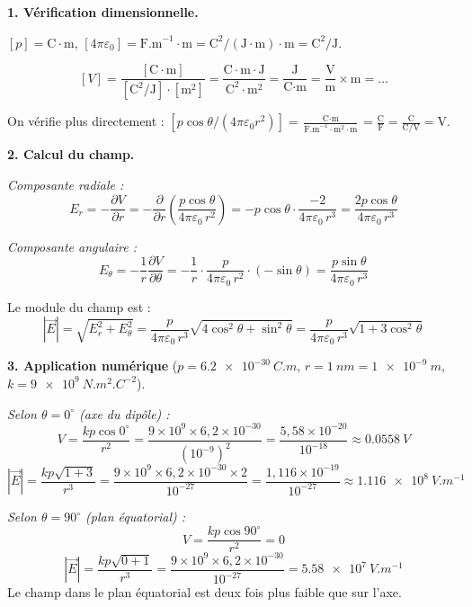 \documentclass[12pt,a4paper]{article}
\begin{document}
\begin{boitecorrige}
\textbf{1. Vérification dimensionnelle.}

$[p] = \text{C}\cdot\text{m}$, $[4\pi\varepsilon_0] = \text{F.m}^{-1}\cdot\text{m} = \text{C}^2/(\text{J}\cdot\text{m}) \cdot\text{m} = \text{C}^2/\text{J}$.

\[
[V] = \frac{[\text{C}\cdot\text{m}]}{[\text{C}^2/\text{J}]\cdot[\text{m}^2]} = \frac{\text{C}\cdot\text{m}\cdot\text{J}}{\text{C}^2\cdot\text{m}^2} = \frac{\text{J}}{\text{C}\cdot\text{m}} = \frac{\text{V}}{\text{m}} \times\text{m} = \ldots
\]

On vérifie plus directement : $[p\cos\theta/(4\pi\varepsilon_0 r^2)] = \frac{\text{C}\cdot\text{m}}{\text{F.m}^{-1}\cdot\text{m}^2\cdot\text{m}} = \frac{\text{C}}{\text{F}} = \frac{\text{C}}{\text{C/V}} = \text{V}$.

\textbf{2. Calcul du champ.}

\textit{Composante radiale :}
\[
E_r = -\frac{\partial V}{\partial r} = -\frac{\partial}{\partial r}\left(\frac{p\cos\theta}{4\pi\varepsilon_0\,r^2}\right) = -p\cos\theta\cdot\frac{-2}{4\pi\varepsilon_0\,r^3} = \frac{2p\cos\theta}{4\pi\varepsilon_0\,r^3}
\]

\textit{Composante angulaire :}
\[
E_\theta = -\frac{1}{r}\frac{\partial V}{\partial\theta} = -\frac{1}{r}\cdot\frac{p}{4\pi\varepsilon_0\,r^2}\cdot(-\sin\theta) = \frac{p\sin\theta}{4\pi\varepsilon_0\,r^3}
\]

Le module du champ est :
\[
|\vec{E}| = \sqrt{E_r^2 + E_\theta^2} = \frac{p}{4\pi\varepsilon_0\,r^3}\sqrt{4\cos^2\theta + \sin^2\theta} = \frac{p}{4\pi\varepsilon_0\,r^3}\sqrt{1 + 3\cos^2\theta}
\]

\textbf{3. Application numérique} ($p = \qty{6.2e-30}{C.m}$, $r = \qty{1}{nm} = \qty{1e-9}{m}$, $k = \qty{9e9}{N.m^2.C^{-2}}$).

\textit{Selon $\theta = 0^\circ $ (axe du dipôle) :}
\[
V = \frac{kp\cos 0^\circ }{r^2} = \frac{9\times10^9\times6{,}2\times10^{-30}}{(10^{-9})^2} = \frac{5{,}58\times10^{-20}}{10^{-18}} \approx \qty{0.0558}{V}
\]
\[
|\vec{E}| = \frac{kp\sqrt{1+3}}{r^3} = \frac{9\times10^9\times6{,}2\times10^{-30}\times2}{10^{-27}} = \frac{1{,}116\times10^{-19}}{10^{-27}} \approx \qty{1.116e8}{V.m^{-1}}
\]

\textit{Selon $\theta = 90^\circ $ (plan équatorial) :}
\[
V = \frac{kp\cos 90^\circ }{r^2} = 0
\]
\[
|\vec{E}| = \frac{kp\sqrt{0+1}}{r^3} = \frac{9\times10^9\times6{,}2\times10^{-30}}{10^{-27}} = \qty{5.58e7}{V.m^{-1}}
\]
Le champ dans le plan équatorial est deux fois plus faible que sur l'axe.


\end{boitecorrige}
\end{document}
